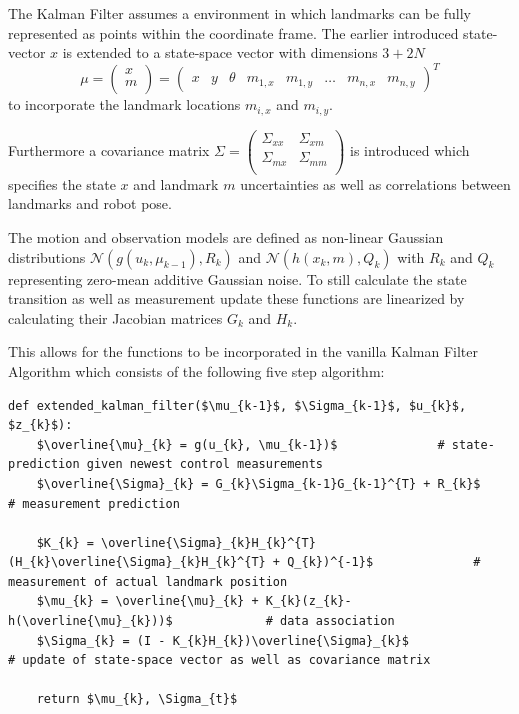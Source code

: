 
The Kalman Filter assumes a environment in which landmarks can be fully represented as points within the coordinate frame. The earlier introduced state-vector $ x $ is extended to a state-space vector with dimensions $ 3 + 2N$
\[ \mu = 
\begin{pmatrix}
	x \\
	m \\
\end{pmatrix}
=
\begin{pmatrix}
	x & y & \theta & m_{1, x} & m_{1, y} & \dots & m_{n, x} & m_{n, y} 
\end{pmatrix} ^{T}
\] 
to incorporate the landmark locations $ m_{i, x} $ and $ m_{i, y} $. 

Furthermore a covariance matrix 
$ \Sigma = 
\begin{pmatrix}
	\Sigma_{xx} & \Sigma_{xm} \\
	\Sigma_{mx} & \Sigma_{mm} \\
\end{pmatrix} $ 
is introduced which specifies the state $ x $ and landmark $ m $ uncertainties as well as correlations between landmarks and robot pose. 

The motion and observation models are defined as non-linear Gaussian distributions $ \mathcal{N}(g(u_{k}, \mu_{k - 1}), R_{k}) $ and $ \mathcal{N}(h(x_{k}, m), Q_{k}) $ with $ R_{k} $ and $ Q_{k} $ representing zero-mean additive Gaussian noise.
To still calculate the state transition as well as measurement update these functions are linearized by calculating their Jacobian matrices $ G_{k} $ and $ H_{k} $.

This allows for the functions to be incorporated in the vanilla Kalman Filter Algorithm which consists of the following five step algorithm:

\begin{lstlisting}[mathescape=true, caption={Pseudo-Code describing the filter cycle of a Extenden Kalman Filter},captionpos=b,label={lst:kalman_filter}]
	def extended_kalman_filter($\mu_{k-1}$, $\Sigma_{k-1}$, $u_{k}$, $z_{k}$):
	$\overline{\mu}_{k} = g(u_{k}, \mu_{k-1})$				# state-prediction given newest control measurements
	$\overline{\Sigma}_{k} = G_{k}\Sigma_{k-1}G_{k-1}^{T} + R_{k}$				# measurement prediction 	 		
	
	$K_{k} = \overline{\Sigma}_{k}H_{k}^{T}(H_{k}\overline{\Sigma}_{k}H_{k}^{T} + Q_{k})^{-1}$				# measurement of actual landmark position
	$\mu_{k} = \overline{\mu}_{k} + K_{k}(z_{k}-h(\overline{\mu}_{k}))$				# data association 
	$\Sigma_{k} = (I - K_{k}H_{k})\overline{\Sigma}_{k}$				# update of state-space vector as well as covariance matrix 
	
	return $\mu_{k}, \Sigma_{t}$
\end{lstlisting}

